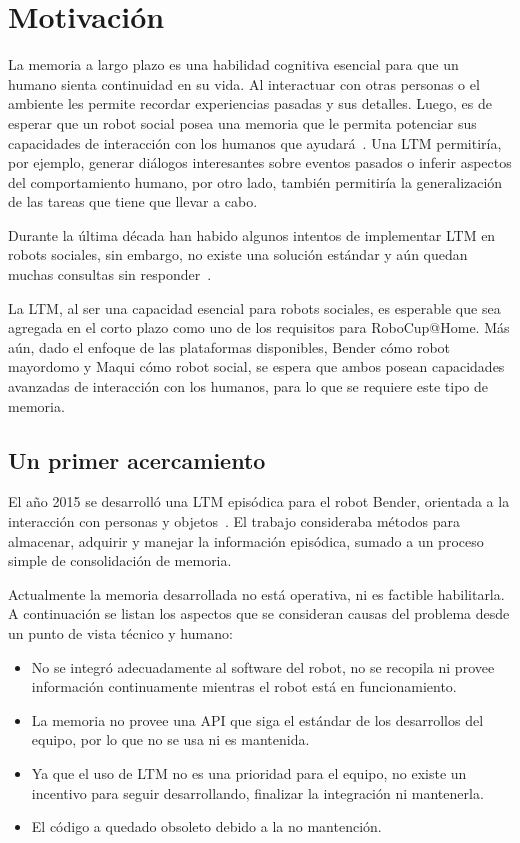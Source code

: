 \section{Motivación}

La memoria a largo plazo es una habilidad cognitiva esencial para que un humano sienta continuidad en su vida. Al interactuar con otras personas o el ambiente les permite recordar experiencias pasadas y sus detalles. Luego, es de esperar que un robot social posea una memoria que le permita potenciar sus capacidades de interacción con los humanos que ayudará~\cite{Vijayakumar2014}. Una LTM permitiría, por ejemplo, generar diálogos interesantes sobre eventos pasados o inferir aspectos del comportamiento humano, por otro lado, también permitiría la generalización de las tareas que tiene que llevar a cabo.

Durante la última década han habido algunos intentos de implementar LTM en robots sociales, sin embargo, no existe una solución estándar y aún quedan muchas consultas sin responder~\cite{ltm_in_robocup}.

La LTM, al ser una capacidad esencial para robots sociales, es esperable que sea agregada en el corto plazo como uno de los requisitos para RoboCup@Home. Más aún, dado el enfoque de las plataformas disponibles, Bender cómo robot mayordomo y Maqui cómo robot social, se espera que ambos posean capacidades avanzadas de interacción con los humanos, para lo que se requiere este tipo de memoria.


\subsection{Un primer acercamiento}\label{sec:primer_acercamiento}

El año 2015 se desarrolló una LTM episódica para el robot Bender, orientada a la interacción con personas y objetos~\cite{Sanchez:2015}. El trabajo consideraba métodos para almacenar, adquirir y manejar la información episódica, sumado a un proceso simple de consolidación de memoria.

Actualmente la memoria desarrollada no está operativa, ni es factible habilitarla. A continuación se listan los aspectos que se consideran causas del problema desde un punto de vista técnico y humano:
\begin{itemize}
	\item No se integró adecuadamente al software del robot, no se recopila ni provee información continuamente mientras el robot está en funcionamiento.
	\item La memoria no provee una API que siga el estándar de los desarrollos del equipo, por lo que no se usa ni es mantenida.
	\item Ya que el uso de LTM no es una prioridad para el equipo, no existe un incentivo para seguir desarrollando, finalizar la integración ni mantenerla. 
	\item El código a quedado obsoleto debido a la no mantención.
\end{itemize}

